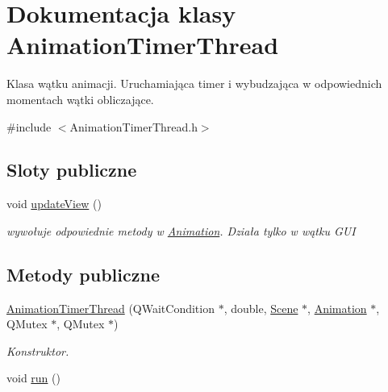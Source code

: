 \hypertarget{class_animation_timer_thread}{\section{Dokumentacja klasy Animation\-Timer\-Thread}
\label{class_animation_timer_thread}
}


Klasa wątku animacji. Uruchamiająca timer i wybudzająca w odpowiednich momentach wątki obliczające.  




{\ttfamily \#include $<$Animation\-Timer\-Thread.\-h$>$}

\subsection*{Sloty publiczne}
\begin{DoxyCompactItemize}
\item 
void \hyperlink{class_animation_timer_thread_a9babdfb5bfefd582ea1a0aaa1a673a49}{update\-View} ()
\begin{DoxyCompactList}\small\item\em wywołuje odpowiednie metody w \hyperlink{class_animation}{Animation}. Działa tylko w wątku G\-U\-I \end{DoxyCompactList}\end{DoxyCompactItemize}
\subsection*{Metody publiczne}
\begin{DoxyCompactItemize}
\item 
\hyperlink{class_animation_timer_thread_a549cf2fb555d948c25ec9e7c0b967a2e}{Animation\-Timer\-Thread} (Q\-Wait\-Condition $\ast$, double, \hyperlink{class_scene}{Scene} $\ast$, \hyperlink{class_animation}{Animation} $\ast$, Q\-Mutex $\ast$, Q\-Mutex $\ast$)
\begin{DoxyCompactList}\small\item\em Konstruktor. \end{DoxyCompactList}\item 
void \hyperlink{class_animation_timer_thread_a653859a0781c75b6f0fe2decd601c0da}{run} ()
\end{DoxyCompactItemize}
